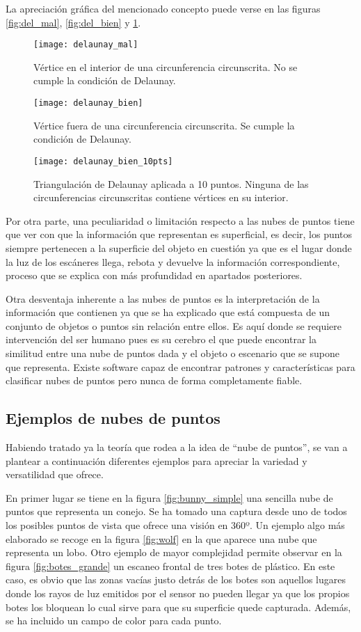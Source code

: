 La apreciación gráfica del mencionado concepto puede verse en las figuras \ref{fig:del_mal}, \ref{fig:del_bien} y \ref{fig:del_bien_10pts}.

\begin{figure}[!htb]
  \texttt{[image: delaunay\_mal]} 
\caption{Vértice en el interior de una circunferencia circunscrita. No se cumple la condición de Delaunay.}
\label{fig:del_mal}
\endminipage\hfill
{}
 \texttt{[image: delaunay\_bien]}
\caption{Vértice fuera de una circunferencia circunscrita. Se cumple la condición de Delaunay.}
\label{fig:del_bien}
\endminipage\hfill
{}
  \texttt{[image: delaunay\_bien\_10pts]}
\caption{Triangulación de Delaunay aplicada a 10 puntos. Ninguna de las circunferencias circunscritas contiene vértices en su interior.}
\label{fig:del_bien_10pts}
\endminipage\hfill
\end{figure}


Por otra parte, una peculiaridad o limitación respecto a las nubes de puntos tiene que ver con que la
información que representan es superficial, es decir, los puntos siempre pertenecen a la superficie del
objeto en cuestión ya que es el lugar donde la luz de los escáneres llega, rebota y devuelve la
información correspondiente, proceso que se explica con más profundidad en apartados posteriores.

Otra desventaja inherente a las nubes de puntos es la interpretación de la información que contienen ya
que se ha explicado que está compuesta de un conjunto de objetos o puntos sin relación entre ellos. Es
aquí donde se requiere intervención del ser humano pues es su cerebro el que puede encontrar la similitud
entre una nube de puntos dada y el objeto o escenario que se supone que representa. Existe software capaz
de encontrar patrones y características para clasificar nubes de puntos pero nunca de forma
completamente fiable.

\subsection{Ejemplos de nubes de puntos}
Habiendo tratado ya la teoría que rodea a la idea de ``nube de puntos'', se van a plantear a continuación diferentes ejemplos para apreciar la variedad y versatilidad que ofrece.

En primer lugar se tiene en la figura \ref{fig:bunny_simple} una sencilla nube de puntos que representa un conejo. Se ha tomado una captura desde uno de todos los posibles puntos de vista que ofrece una visión en 360º.
Un ejemplo algo más elaborado se recoge en la figura \ref{fig:wolf} en la que aparece una nube que representa un lobo. 
Otro ejemplo de mayor complejidad permite observar en la figura \ref{fig:botes_grande} un escaneo frontal de tres botes de plástico. En este caso, es obvio que las zonas vacías justo detrás de los botes son aquellos lugares donde los rayos de luz emitidos por el sensor no pueden llegar ya que los propios botes los bloquean lo cual sirve para que su superficie quede capturada. Además, se ha incluido un campo de color para cada punto.


